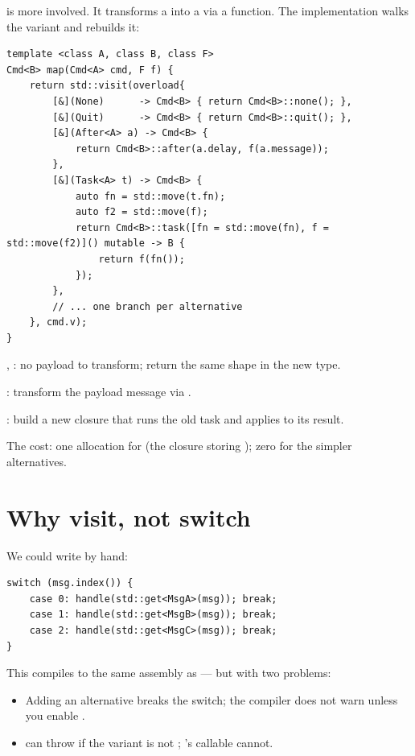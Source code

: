  is more involved. It transforms a
 into a  via a
function. The implementation walks the variant and rebuilds it:

\begin{lstlisting}
template <class A, class B, class F>
Cmd<B> map(Cmd<A> cmd, F f) {
    return std::visit(overload{
        [&](None)      -> Cmd<B> { return Cmd<B>::none(); },
        [&](Quit)      -> Cmd<B> { return Cmd<B>::quit(); },
        [&](After<A> a) -> Cmd<B> {
            return Cmd<B>::after(a.delay, f(a.message));
        },
        [&](Task<A> t) -> Cmd<B> {
            auto fn = std::move(t.fn);
            auto f2 = std::move(f);
            return Cmd<B>::task([fn = std::move(fn), f = std::move(f2)]() mutable -> B {
                return f(fn());
            });
        },
        // ... one branch per alternative
    }, cmd.v);
}
\end{lstlisting}

, : no payload to transform; return the
same shape in the new type.

: transform the payload message via .

: build a new closure that runs the old task and
applies  to its result.

The cost: one allocation for  (the closure storing
); zero for the simpler alternatives.

\section{Why visit, not switch}

We could write  by hand:

\begin{lstlisting}
switch (msg.index()) {
    case 0: handle(std::get<MsgA>(msg)); break;
    case 1: handle(std::get<MsgB>(msg)); break;
    case 2: handle(std::get<MsgC>(msg)); break;
}
\end{lstlisting}

This compiles to the same assembly as  ---
but with two problems:

\begin{itemize}[leftmargin=*]
  \item Adding an alternative breaks the switch; the compiler
    does not warn unless you enable .
  \item {} can throw if the variant is not
    ; 's callable cannot.
\end{itemize}

